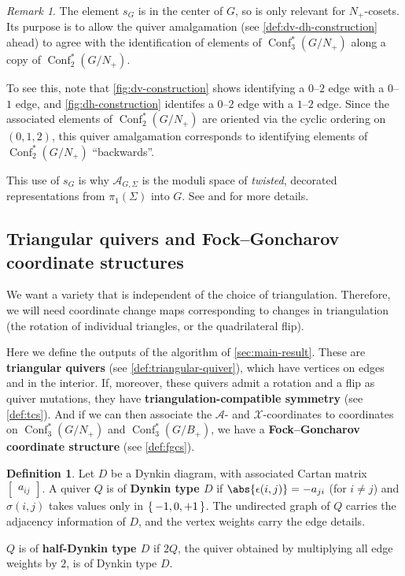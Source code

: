 \documentclass{amsart}
\theoremstyle{plain}
\theoremstyle{definition}
\newtheorem{definition}[theorem]{Definition}
\theoremstyle{remark}
\newtheorem{remark}[theorem]{Remark}
\newcommand{\defined}[1]{\textbf{#1}}
\DeclareMathOperator{\Conf}{Conf}
\DeclarePairedDelimiter\abs||
\begin{document}
  \begin{remark}
    \label{rem:purpose-of-sG}
    The element $s_G$ is in the center of $G$, so is only relevant for
    $N_{+}$-cosets. Its purpose is to allow the quiver amalgamation (see
    \cref{def:dv-dh-construction} ahead) to agree with the
    identification of elements of $\Conf_3^{\ast}(G/N_{+})$ along a copy
    of $\Conf_2^{\ast}(G/N_{+})$.

    To see this, note that \cref{fig:dv-construction} shows identifying
    a $0$--$2$ edge with a $0$--$1$ edge, and \cref{fig:dh-construction}
    identifes a $0$--$2$ edge with a $1$--$2$ edge. Since the associated
    elements of $\Conf_2^{\ast}(G/N_{+})$ are oriented via the cyclic
    ordering on $(0,1,2)$, this quiver amalgamation corresponds to
    identifying elements of $\Conf_2^{\ast}(G/N_{+})$ ``backwards''.

    This use of $s_G$ is why $\mathcal{A}_{G,\Sigma}$ is the moduli
    space of \emph{twisted}, decorated representations from
    $\pi_1(\Sigma)$ into $G$. See \cite[Section~8.6]{fockgoncharov2006}
    and \cite[Section~2.3]{zickert2016} for more details.
  \end{remark}

  \subsection{Triangular quivers and Fock--Goncharov coordinate
    structures}

  We want a variety that is independent of the choice of triangulation.
  Therefore, we will need coordinate change maps corresponding to
  changes in triangulation (the rotation of individual triangles, or the
  quadrilateral flip).

  Here we define the outputs of the algorithm of \cref{sec:main-result}.
  These are \defined{triangular quivers} (see
  \cref{def:triangular-quiver}), which have vertices on edges and in the
  interior. If, moreover, these quivers admit a rotation and a flip as
  quiver mutations, they have \defined{triangulation-compatible
    symmetry} (see \cref{def:tcs}). And if we can then associate the
  $\mathcal{A}$- and $\mathcal{X}$-coordinates to coordinates on
  $\Conf_3^{\ast}(G/N_{+})$ and $\Conf_3^{\ast}(G/B_{+})$, we have a
  \defined{Fock--Goncharov coordinate structure} (see \cref{def:fgcs}).

  \begin{definition}
    \label{def:dynkin-type}
    Let $D$ be a Dynkin diagram, with associated Cartan matrix
    $\begin{bmatrix}a_{ij}\end{bmatrix}$. A quiver $Q$ is of
    \defined{Dynkin type $D$} if $\abs{\epsilon(i,j)} = -a_{ji}$ (for $i
    \ne j$) and $\sigma(i,j)$ takes values only in $\set{-1, 0, +1}$.
    The undirected graph of $Q$ carries the adjacency information of
    $D$, and the vertex weights carry the edge details.

    $Q$ is of \defined{half-Dynkin type $D$} if $2Q$, the quiver
    obtained by multiplying all edge weights by $2$, is of Dynkin type
    $D$.
  \end{definition}
\end{document}
